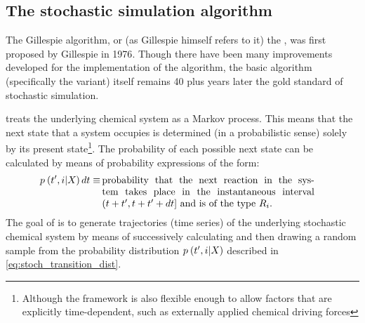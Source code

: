 \subsection{The stochastic simulation algorithm}

The Gillespie algorithm, or (as Gillespie himself refers to it\cite{Gillespie:2013kk}) the , was first proposed by Gillespie in 1976\cite{Gillespie:1976bj}. Though there have been many improvements developed for the implementation\cite{Gibson:2000jqa,Cao:2004cua,Lok:2005ii,McCollum:2006hj} of the algorithm, the basic algorithm (specifically the  variant) itself remains 40 plus years later the gold standard of stochastic simulation.

 treats the underlying chemical system as a Markov process. This means that the next state that a system occupies is determined (in a probabilistic sense) solely by its present state\footnote{Although the framework is also flexible enough to allow factors that are explicitly time-dependent, such as externally applied chemical driving forces}. The probability of each possible next state can be calculated by means of probability expressions of the form:
\begin{align}\label{eq:stoch_transition_dist}
    \transp \dt \equiv&\, \parbox[t]{0.63\linewidth}{probability that the next reaction in the system takes place in the instantaneous interval $\timeintp$ and is of the type $\rxn$.}
\end{align}
The goal of  is to generate trajectories (\ie time series) of the underlying stochastic chemical system by means of successively calculating and then drawing a random sample from the probability distribution $p_{} \left( t', i | X_{} \right)$ described in \eqref{eq:stoch_transition_dist}.
 
